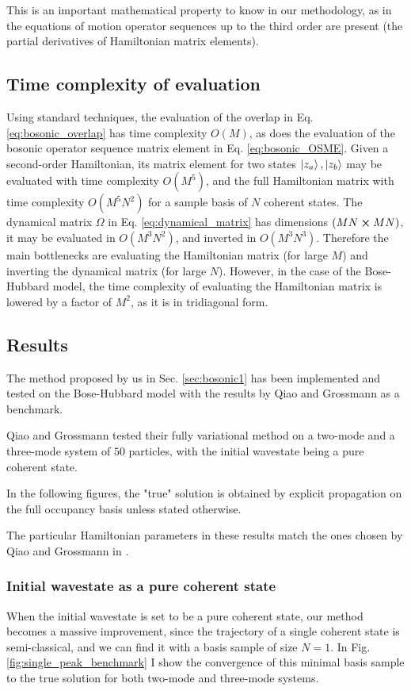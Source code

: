 This is an important mathematical property to know in our methodology, as in the equations of motion operator sequences up to the third order are present (the partial derivatives of Hamiltonian matrix elements).

\subsection{Time complexity of evaluation}
Using standard techniques, the evaluation of the overlap in Eq. \ref{eq:bosonic_overlap} has time complexity $O(M)$, as does the evaluation of the bosonic operator sequence matrix element in Eq. \ref{eq:bosonic_OSME}. Given a second-order Hamiltonian, its matrix element for two states $\ket{z_a},\ket{z_b}$ may be evaluated with time complexity $O(M^5)$, and the full Hamiltonian matrix with time complexity $O(M^5N^2)$ for a sample basis of $N$ coherent states. The dynamical matrix $\Omega$ in Eq. \ref{eq:dynamical_matrix} has dimensions $(MN\cross MN)$, it may be evaluated in $O(M^3N^2)$, and inverted in $O(M^3N^3)$. Therefore the main bottlenecks are evaluating the Hamiltonian matrix (for large $M$) and inverting the dynamical matrix (for large $N$). However, in the case of the Bose-Hubbard model, the time complexity of evaluating the Hamiltonian matrix is lowered by a factor of $M^2$, as it is in tridiagonal form.


\subsection{Results}
The method proposed by us in Sec. \ref{sec:bosonic1} has been implemented and tested on the Bose-Hubbard model with the results by Qiao and Grossmann as a benchmark.

Qiao and Grossmann tested their fully variational method on a two-mode and a three-mode system of $50$ particles, with the initial wavestate being a pure coherent state.

In the following figures, the "true" solution is obtained by explicit propagation on the full occupancy basis unless stated otherwise.

The particular Hamiltonian parameters in these results match the ones chosen by Qiao and Grossmann in \cite{grossmann}.

\subsubsection{Initial wavestate as a pure coherent state}
When the initial wavestate is set to be a pure coherent state, our method becomes a massive improvement, since the trajectory of a single coherent state is semi-classical, and we can find it with a basis sample of size $N=1$. In Fig. \ref{fig:single_peak_benchmark} I show the convergence of this minimal basis sample to the true solution for both two-mode and three-mode systems.

